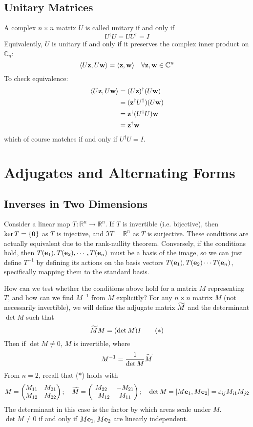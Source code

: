 \documentclass{article}
\begin{document}
\subsection{Unitary Matrices}
A complex $n \times n$ matrix $U$ is called unitary if and only if
\[ U^\dagger U = U U^\dagger = I \]
Equivalently, $U$ is unitary if and only if it preserves the complex inner product on $\mathbb C_n$:
\[ \langle U \vb z, U \vb w \rangle = \langle \vb z, \vb w \rangle\quad \forall \vb z, \vb w \in \mathbb C^n \]
To check equivalence:
\begin{align*}
	\langle U \vb z, U \vb w \rangle & = (U \vb z)^\dagger (U \vb w)         \\
	                                 & = (\vb z^\dagger U^\dagger) (U \vb w) \\
	                                 & = \vb z^\dagger (U^\dagger U) \vb w   \\
	                                 & = \vb z^\dagger \vb w
\end{align*}
which of course matches if and only if $U^\dagger U = I$.

\section{Adjugates and Alternating Forms}
\subsection{Inverses in Two Dimensions}
Consider a linear map $T\colon \mathbb R^n \to \mathbb R^n$. If $T$ is invertible (i.e. bijective), then $\ker T = \{ \vb 0 \}$ as $T$ is injective, and $\Im T = \mathbb R^n$ as $T$ is surjective. These conditions are actually equivalent due to the rank-nullity theorem. Conversely, if the conditions hold, then $T(\vb e_1), T(\vb e_2), \cdots, T(\vb e_n)$ must be a basis of the image, so we can just define $T^{-1}$ by defining its actions on the basis vectors $T(\vb e_1), T(\vb e_2) \cdots T(\vb e_n)$, specifically mapping them to the standard basis.

How can we test whether the conditions above hold for a matrix $M$ representing $T$, and how can we find $M^{-1}$ from $M$ explicitly? For any $n \times n$ matrix $M$ (not necessarily invertible), we will define the adjugate matrix $\widetilde{M}$ and the determinant $\det M$ such that
\[ \widetilde{M} M = (\det M) I \tag{$\ast$} \]
Then if $\det M \neq 0$, $M$ is invertible, where
\[ M^{-1} = \frac{1}{\det M}\widetilde{M} \]
From $n=2$, recall that ($\ast$) holds with
\[ M = \begin{pmatrix}
		M_{11} & M_{21} \\
		M_{12} & M_{22}
	\end{pmatrix};\quad \widetilde{M} = \begin{pmatrix}
		M_{22}  & -M_{21} \\
		-M_{12} & M_{11}
	\end{pmatrix};\quad \det M = [M\vb e_1, M\vb e_2] = \varepsilon_{ij}M_{i1}M_{j2} \]
The determinant in this case is the factor by which areas scale under $M$. $\det M \neq 0$ if and only if $M\vb e_1, M\vb e_2$ are linearly independent.
\end{document}
